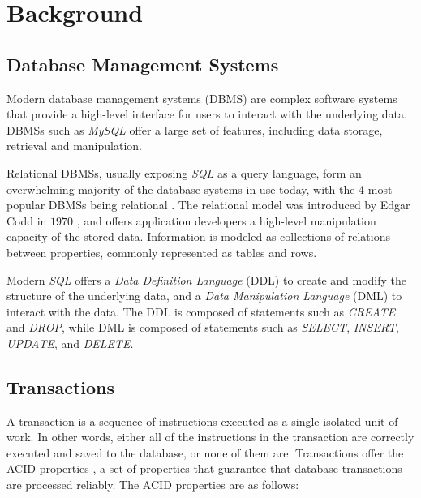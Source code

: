\chapter{Background}

 
\section{Database Management Systems}

Modern database management systems (DBMS) are complex software systems that provide a high-level interface for users to interact with the underlying data. DBMSs such as \textit{MySQL} \cite{mysqlwebpage} offer a large set of features, including data storage, retrieval and manipulation.

Relational DBMSs, usually exposing \textit{SQL} as a query language, form an overwhelming majority of the database systems in use today, with the 4 most popular DBMSs being relational \cite{akhtar2023popularity}. The relational model was introduced by Edgar Codd in $1970$ \cite{codd1970relational}, and offers application developers a high-level manipulation capacity of the stored data. Information is modeled as collections of relations between properties, commonly represented as tables and rows.

Modern \textit{SQL} offers a \textit{Data Definition Language} (DDL) to create and modify the structure of the underlying data, and a \textit{Data Manipulation Language} (DML) to interact with the data. The DDL is composed of statements such as \textit{CREATE} and \textit{DROP}, while DML is composed of statements such as \textit{SELECT}, \textit{INSERT}, \textit{UPDATE}, and \textit{DELETE}.

\section{Transactions}

A transaction is a sequence of instructions executed as a single isolated unit of work. In other words, either all of the instructions in the transaction are correctly executed and saved to the database, or none of them are. Transactions offer the ACID properties \cite{gray1981transaction}, a set of properties that guarantee that database transactions are processed reliably. The ACID properties are as follows:

